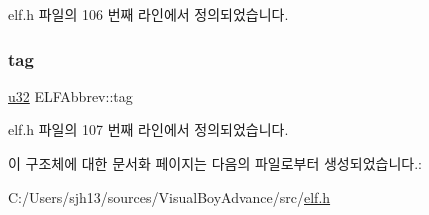 elf.\+h 파일의 106 번째 라인에서 정의되었습니다.

\mbox{\label{struct_e_l_f_abbrev_a0f670bcd5edab3ceab501595357d4c01}} 
\subsubsection{\texorpdfstring{tag}{tag}}
{\footnotesize\ttfamily \mbox{\hyperlink{_system_8h_a10e94b422ef0c20dcdec20d31a1f5049}{u32}} E\+L\+F\+Abbrev\+::tag}



elf.\+h 파일의 107 번째 라인에서 정의되었습니다.



이 구조체에 대한 문서화 페이지는 다음의 파일로부터 생성되었습니다.\+:\begin{DoxyCompactItemize}
\item 
C\+:/\+Users/sjh13/sources/\+Visual\+Boy\+Advance/src/\mbox{\hyperlink{elf_8h}{elf.\+h}}\end{DoxyCompactItemize}
